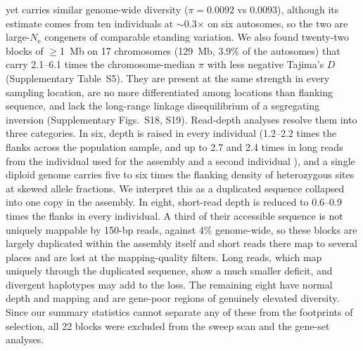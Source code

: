 \documentclass[11pt]{article}
\newcommand{\Ne}{N_\mathrm{e}}
\begin{document}
yet carries similar genome-wide diversity ($\pi=0.0092$ vs 0.0093), although its estimate comes from ten individuals at $\sim$0.3$\times$ on six autosomes, so the two are large-$\Ne$ congeners of comparable standing variation.
We also found twenty-two blocks of $\geq$1~Mb on 17 chromosomes (129~Mb, 3.9\% of the autosomes) that carry 2.1--6.1 times the chromosome-median $\pi$ with less negative Tajima's $D$ (Supplementary Table~S5). 
They are present at the same strength in every sampling location, are no more differentiated among locations
than flanking sequence, and lack the long-range linkage disequilibrium of a segregating inversion (Supplementary Figs.~S18, S19).
Read-depth analyses resolve them into three categories. In six, depth is raised in every individual
(1.2--2.2 times the flanks across the population sample, and up to 2.7 and 2.4 times in long reads 
from the individual used for the assembly and a second individual \citep{small2026}), and a single diploid genome carries 
five to six times the flanking density of heterozygous sites at skewed allele fractions. We interpret this as a duplicated 
sequence collapsed into one copy in the assembly. In eight, short-read depth is reduced to 0.6--0.9 times the flanks in every individual. A third of their accessible sequence is not uniquely mappable by 150-bp reads, against 4\% genome-wide, so these blocks are largely duplicated within the assembly itself and short reads there map to several places and are lost at the mapping-quality filters. Long reads, which map uniquely through the duplicated sequence, show a much smaller deficit, and divergent haplotypes may add to the loss. The remaining eight have normal depth and mapping and are gene-poor regions of genuinely 
elevated diversity. Since our summary statistics cannot separate any of these from the footprints of selection, 
all 22 blocks were excluded from the sweep scan and the gene-set analyses.
\end{document}
